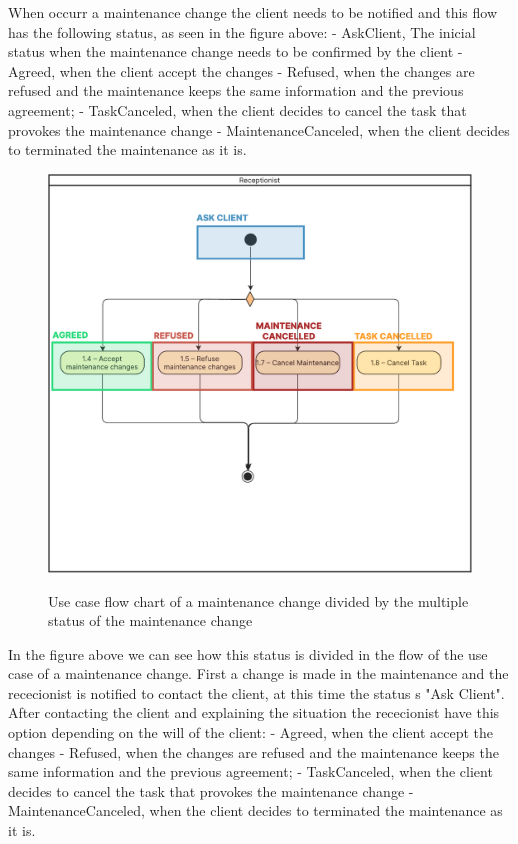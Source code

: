 When occurr a maintenance change the client needs to be notified and this flow has the following status, as seen in the figure above:
- AskClient, The inicial status when the maintenance change needs to be confirmed by the client
- Agreed, when the client accept the changes
- Refused, when the changes are refused and the maintenance keeps the same information and the previous agreement; 
- TaskCanceled, when the client decides to cancel the task that provokes the maintenance change
- MaintenanceCanceled, when the client decides to terminated the maintenance as it is.



\begin{figure}[h]
  \caption{Use case flow chart of a maintenance change divided by the multiple status of the maintenance change}
  \centering
  \includegraphics[width=\textwidth]{figs/Status/MaintenanceChange/UseCaseStatus}
  \label{fig:figure2}
\end{figure}

In the figure above we can see how this status is divided in the flow of the use case of a maintenance change.
First a change is made in the maintenance and the rececionist is notified to contact the client, at this time the status s "Ask Client".
After contacting the client and explaining the situation the rececionist have this option depending on the will of the client:
- Agreed, when the client accept the changes
- Refused, when the changes are refused and the maintenance keeps the same information and the previous agreement; 
- TaskCanceled, when the client decides to cancel the task that provokes the maintenance change
- MaintenanceCanceled, when the client decides to terminated the maintenance as it is.

